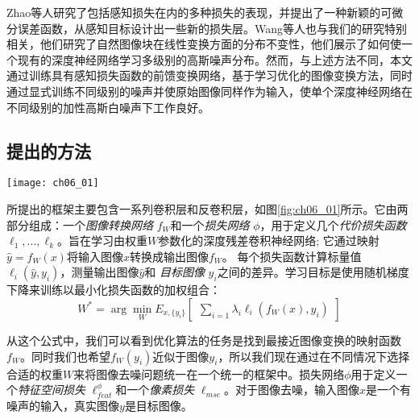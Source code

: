 Zhao等人\cite{Zhao2015}研究了包括感知损失在内的多种损失的表现，并提出了一种新颖的可微分误差函数，从感知目标设计出一些新的损失层。Wang等人\cite{Wang2014a}也与我们的研究特别相关，他们研究了自然图像块在线性变换方面的分布不变性，他们展示了如何使一个现有的深度神经网络学习多级别的高斯噪声分布。然而，与上述方法不同，本文通过训练具有感知损失函数的前馈变换网络，基于学习优化的图像变换方法，同时通过显式训练不同级别的噪声并使原始图像同样作为输入，使单个深度神经网络在不同级别的加性高斯白噪声下工作良好。

\subsection{提出的方法} 

\label{sec:method}
\begin{figure*}
\vspace{-6mm}
\centering
\texttt{[image: ch06\_01]}
\caption[提出网络的整体架构图]{提出的网络的整体架构示意图。图像变换网络包含卷积（编码器）和解卷积（解码器）层。我们使用预先训练的图像分类的损失网络的特征表示来定义感知损失函数，这些函数测量输出和真实标签的感知差异，损失网络的特征表示在训练过程中保持不变。}
\label{fig:ch06_01}
\vspace{-2mm}
\end{figure*}
 
所提出的框架主要包含一系列卷积层和反卷积层，如图\ref{fig:ch06_01}所示。它由两部分组成：一个\emph {图像转换网络} $ f_W $和一个\emph{损失网络} $ \phi $，用于定义几个\emph {代价损失函数} $ \ell_1,\ldots,\ell_k$。旨在学习由权重$ W $参数化的深度残差卷积神经网络; 它通过映射$ \hat y = f_W (x)$将输入图像$ x $转换成输出图像$ f_W $。
每个损失函数计算标量值$ \ell_i(\hat y,y_i)$，测量输出图像$ \hat y $和 \emph{目标图像} $ y_i $之间的差异。学习目标是使用随机梯度下降来训练以最小化损失函数的加权组合：
\begin{equation}
   W^* = \arg\min_W E_{x, \{y_i\}}\begin{bmatrix}
\sum_{i=1} \lambda_i \ell_i(f_W(x), y_i)
\end{bmatrix}
\end{equation}

从这个公式中，我们可以看到优化算法的任务是找到最接近图像变换的映射函数$ f_W $。同时我们也希望$ f_W(y_i)$近似于图像$ y_i $，所以我们现在通过在不同情况下选择合适的权重$ W $来将图像去噪问题统一在一个统一的框架中。损失网络$ \phi $用于定义一个\emph{特征空间损失} $ \ell_{feat}^\phi $和一个\emph{像素损失} $ \ell_{mse} $。对于图像去噪，输入图像$ x $是一个有噪声的输入，真实图像$ y $是目标图像。
  
